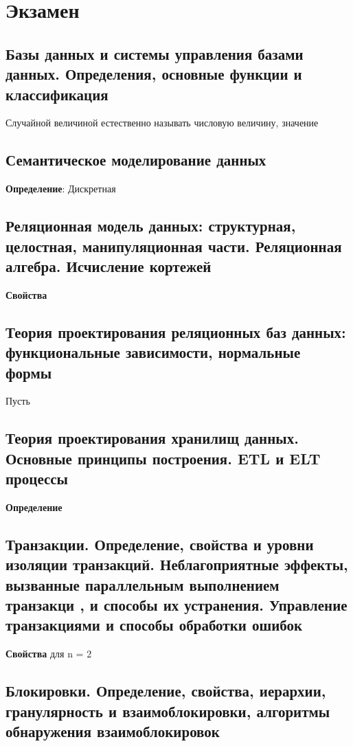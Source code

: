 \section{Экзамен}

\subsection{Базы данных и системы управления базами данных. Определения, основные функции и классификация}

Случайной величиной естественно называть числовую величину, значение 

\subsection{Семантическое моделирование данных}

\textbf{Определение}: Дискретная


\subsection{Реляционная модель данных: структурная, целостная, манипуляционная части. Реляционная алгебра. Исчисление кортежей}

\textbf{Свойства}


\subsection{Теория проектирования реляционных баз данных: функциональные зависимости, нормальные формы}

Пусть 


\subsection{Теория проектирования хранилищ данных. Основные принципы построения. ETL и ELT процессы}

\textbf{Определение}

\subsection{Транзакции. Определение, свойства и уровни изоляции транзакций. Неблагоприятные эффекты, вызванные параллельным выполнением транзакци , и способы их устранения. Управление транзакциями и способы обработки ошибок}

\textbf{Свойства} для n = 2


\subsection{Блокировки. Определение, свойства, иерархии, гранулярность и взаимоблокировки, алгоритмы обнаружения взаимоблокировок}

